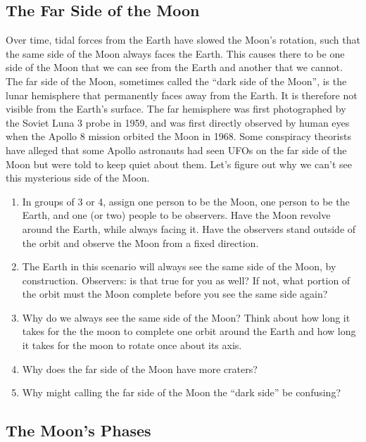 \documentclass[12pt]{article}%
\begin{document}
\subsection{The Far Side of the Moon}
Over time, tidal forces from the Earth have slowed the Moon's rotation, such that the same side of the Moon always faces the Earth. This causes there to be one side of the Moon that we can see from the Earth and another that we cannot.
The far side of the Moon, sometimes called the ``dark side of the Moon'', is the lunar hemisphere that permanently faces away from the Earth. 
It is therefore not visible from the Earth's surface. 
The far hemisphere was first photographed by the Soviet Luna 3 probe in 1959, and was first directly observed by human eyes when the Apollo 8 mission orbited the Moon in 1968.
Some conspiracy theorists have alleged that some Apollo astronauts had seen UFOs on the far side of the Moon but were told to keep quiet about them. 
Let's figure out why we can't see this mysterious side of the Moon.
\begin{enumerate}
    \item In groups of 3 or 4, assign one person to be the Moon, one person to be the Earth, and one (or two) people to be observers. 
    Have the Moon revolve around the Earth, while always facing it. 
    Have the observers stand outside of the orbit and observe the Moon from a fixed direction. 
    \item The Earth in this scenario will always see the same side of the Moon, by construction. 
    Observers: is that true for you as well?
    If not, what portion of the orbit must the Moon complete before you see the same side again? 
    \item Why do we always see the same side of the Moon? 
    Think about how long it takes for the the moon to complete one orbit around the Earth and how long it takes for the moon to rotate once about its axis. 
    \item Why does the far side of the Moon have more craters?
    \item Why might calling the far side of the Moon the ``dark side'' be confusing?
\end{enumerate}


\subsection{The Moon's Phases}
\end{document}
